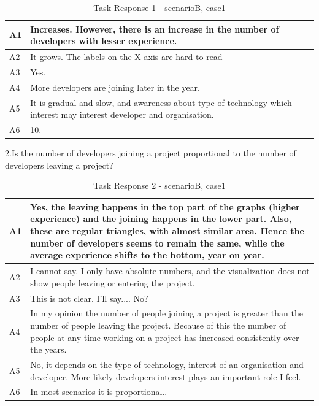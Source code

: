 \documentclass[seploa]{beavtex}
\begin{document}
\begin{appendices}
\begin{table}[H]
\begin{tabular}{ |p{2cm}|p{12cm}| }
 \hline
 A1 & Increases. However, there is an increase in the number of developers with lesser experience.\\
 \hline
 A2 & It grows. The labels on the X axis are hard to read
\\ \hline
 A3 & Yes.\\ \hline
 A4 & More developers are joining later in the year.\\ \hline
 A5 & It is gradual and slow, and awareness about type of technology which interest may interest developer and organisation.\\ \hline
 A6 & 10.\\
 \hline
\end{tabular}
\caption{Task Response 1 - scenarioB, case1}
\label{tab:table21}
\end{table}

2.Is the number of developers joining a project proportional to the number of developers leaving a project?	

\begin{table}[H]
\begin{tabular}{ |p{2cm}|p{12cm}| }
 \hline
 A1 & Yes, the leaving happens in the top part of the graphs (higher experience) and the joining happens in the lower part. Also, these are regular triangles, with almost similar area. Hence the number of developers seems to remain the same, while the average experience shifts to the bottom, year on year.\\
 \hline
 A2 & I cannot say. I only have absolute numbers, and the visualization does not show people leaving or entering the project.\\ \hline
 A3 & This is not clear. I'll say.... No?\\ \hline
 A4 & In my opinion the number of people joining a project is greater than the number of people leaving the project. Because of this the number of people at any time working on a project has increased consistently over the years.\\ \hline
 A5 & No, it depends on the type of technology, interest of an organisation and developer. More likely developers interest plays an important role I feel.\\ \hline
 A6 & In most scenarios it is proportional..\\
 \hline
\end{tabular}
\caption{Task Response 2 - scenarioB, case1}
\label{tab:table22}
\end{table}


\end{appendices}
\end{document}
